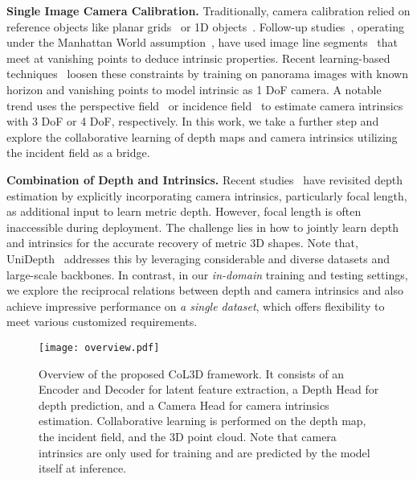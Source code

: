 \textbf{Single Image Camera Calibration.}
Traditionally, camera calibration relied on reference objects like planar grids~\cite{zhang2000flexible} or 1D objects~\cite{zhang2004camera}. Follow-up studies~\cite{schindler2004atlanta,xu2013minimum,wildenauer2012robust,deutscher2002automatic}, operating under the Manhattan World assumption~\cite{coughlan1999manhattan}, have used image line segments~\cite{von2008lsd,akinlar2011edlines} that meet at vanishing points to deduce intrinsic properties. Recent learning-based techniques~\cite{hold2018perceptual,lee2021ctrl,lee2020neural} loosen these constraints by training on panorama images with known horizon and vanishing points to model intrinsic as 1 DoF camera. A notable trend uses the perspective field~\cite{jin2023perspective} or incidence field~\cite{zhu2024tame} to estimate camera intrinsics with 3 DoF or 4 DoF, respectively. In this work, we take a further step and explore the collaborative learning of depth maps and camera intrinsics utilizing the incident field as a bridge.

\textbf{Combination of Depth and Intrinsics.}
Recent studies~\cite{Facil_2019_CVPR,Yin_2023_ICCV,Guizilini_2023_ICCV} have revisited depth estimation by explicitly incorporating camera intrinsics, particularly focal length, as additional input to learn metric depth. However, focal length is often inaccessible during deployment. The challenge lies in how to jointly learn depth and intrinsics for the accurate recovery of metric 3D shapes. Note that, UniDepth~\cite{piccinelli2024unidepth} addresses this by leveraging considerable and diverse datasets and large-scale backbones. In contrast, in our \textit{in-domain} training and testing settings, we explore the reciprocal relations between depth and camera intrinsics and also achieve impressive performance on \textit{a single dataset}, which offers flexibility to meet various customized requirements.


\begin{figure*}[t]
\begin{center}
\texttt{[image: overview.pdf]}
\end{center}
\vspace{-5mm}
\caption{Overview of the proposed CoL3D framework. It consists of an Encoder and Decoder for latent feature extraction, a Depth Head for depth prediction, and a Camera Head for camera intrinsics estimation. Collaborative learning is performed on the depth map, the incident field, and the 3D point cloud. Note that camera intrinsics are only used for training and are predicted by the model itself at inference.}
\label{fig:overview}
\vspace{-3mm}
\end{figure*}